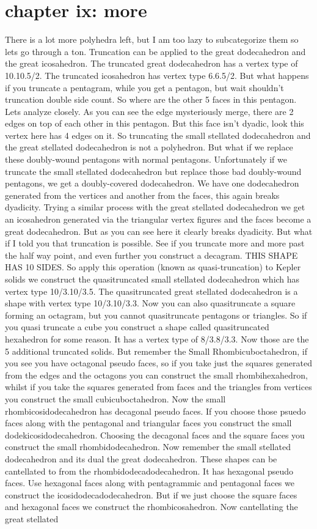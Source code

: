 \documentclass{article}
\begin{document}
\section*{chapter ix: more}
There is a lot more polyhedra left, but I am too lazy to subcategorize them so lets go through a ton. Truncation can be applied to the great dodecahedron and the great icosahedron. The truncated great dodecahedron has a vertex type of 10.10.5/2. The truncated icosahedron has vertex type 6.6.5/2. But what happens if you truncate a pentagram, while you get a pentagon, but wait shouldn't truncation double side count. So where are the other 5 faces in this pentagon. Lets analyze closely. As you can see the edge mysteriously merge, there are 2 edges on top of each other in this pentagon. But this face isn't dyadic, look this vertex here has 4 edges on it. So truncating the small stellated dodecahedron and the great stellated dodecahedron is not a polyhedron. But what if we replace these doubly-wound pentagons with normal pentagons. Unfortunately if we truncate the small stellated dodecahedron but replace those bad doubly-wound pentagons, we get a doubly-covered dodecahedron. We have one dodecahedron generated from the vertices and another from the faces, this again breaks dyadicity. Trying a similar process with the great stellated dodecahedron we get an icosahedron generated via the triangular vertex figures and the faces become a great dodecahedron. But as you can see here it clearly breaks dyadicity. But what if I told you that truncation is possible. See if you truncate more and more past the half way point, and even further you construct a decagram. THIS SHAPE HAS 10 SIDES. So apply this operation (known as quasi-truncation) to Kepler solids we construct the quasitruncated small stellated dodecahedron which has vertex type 10/3.10/3.5. The quasitruncated great stellated dodecahedron is a shape with vertex type 10/3.10/3.3. Now you can also quasitruncate a square forming an octagram, but you cannot quasitruncate pentagons or triangles. So if you quasi truncate a cube you construct a shape called quasitruncated hexahedron for some reason. It has a vertex type of 8/3.8/3.3. Now those are the 5 additional truncated solids. But remember the Small Rhombicuboctahedron, if you see you have octagonal pseudo faces, so if you take just the squares generated from the edges and the octagons you can construct the small rhombihexahedron, whilst if you take the squares generated from faces and the triangles from vertices you construct the small cubicuboctahedron. Now the small rhombicosidodecahedron has decagonal pseudo faces. If you choose those psuedo faces along with the pentagonal and triangular faces you construct the small dodekicosidodecahedron. Choosing the decagonal faces and the square faces you construct the small rhombidodecahedron. Now remember the small stellated dodecahedron and its dual the great dodecahedron. These shapes can be cantellated to from the rhombidodecadodecahedron. It has hexagonal pseudo faces. Use hexagonal faces along with pentagrammic and pentagonal faces we construct the icosidodecadodecahedron. But if we just choose the square faces and hexagonal faces we construct the rhombicosahedron.  Now cantellating the great stellated 
\end{document}
